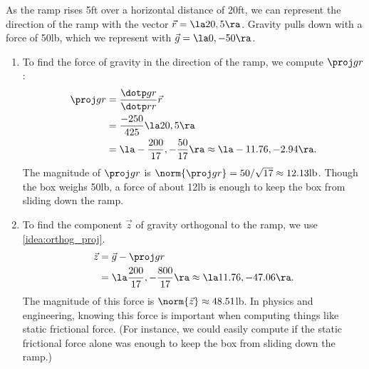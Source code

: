 {As the ramp rises 5ft over a horizontal distance of 20ft, we can represent the direction of the ramp with the vector $\vec r= \la 20,5\ra$. Gravity pulls down with a force of 50lb, which we represent with $\vec g = \la 0,-50\ra$. 
\begin{enumerate}
	\item To find the force of gravity in the direction of the ramp, we compute $\proj gr$:
	\begin{align*}
	\proj gr &= \frac{\dotp gr}{\dotp rr}\vec r\\
					&=  \frac{-250}{425}\la 20,5\ra\\
					&= \la -\frac{200}{17},-\frac{50}{17}\ra \approx \la -11.76,-2.94\ra.
	\end{align*}
	The magnitude of $\proj gr$ is $\norm{\proj gr} = 50/\sqrt{17} \approx 12.13\text{lb}$. Though the box weighs 50lb, a force of about 12lb is enough to keep the box from sliding down the ramp.
	
	\item		To find the component $\vec z$ of gravity orthogonal to the ramp, we use \autoref{idea:orthog_proj}.
	\begin{align*}
	\vec z &= \vec g - \proj gr \\
					&= \la \frac{200}{17},-\frac{800}{17}\ra \approx \la 11.76,-47.06\ra.
	\end{align*}
	The magnitude of this force is $\norm{\vec z} \approx 48.51$lb. In physics and engineering, knowing this force is important when computing things like static frictional force. (For instance, we could easily compute if the static frictional force alone was enough to keep the box from sliding down the ramp.)
\end{enumerate}}

